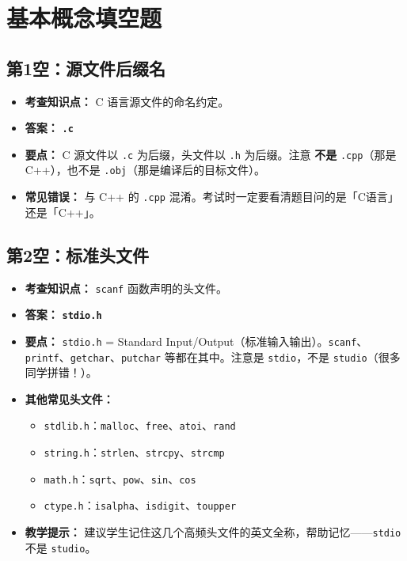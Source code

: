 \section{基本概念填空题}

\subsection{第1空：源文件后缀名}

\begin{itemize}
    \item \textbf{考查知识点：} C 语言源文件的命名约定。
    \item \textbf{答案：} \texttt{\textbf{.c}}
    \item \textbf{要点：} C 源文件以 \texttt{.c} 为后缀，头文件以 \texttt{.h} 为后缀。注意 \textbf{不是} \texttt{.cpp}（那是 C++），也不是 \texttt{.obj}（那是编译后的目标文件）。
    \item \textbf{常见错误：} 与 C++ 的 \texttt{.cpp} 混淆。考试时一定要看清题目问的是「C语言」还是「C++」。
\end{itemize}

\subsection{第2空：标准头文件}

\begin{itemize}
    \item \textbf{考查知识点：} \texttt{scanf} 函数声明的头文件。
    \item \textbf{答案：} \texttt{\textbf{stdio.h}}
    \item \textbf{要点：} \texttt{stdio.h} = Standard Input/Output（标准输入输出）。\texttt{scanf}、\texttt{printf}、\texttt{getchar}、\texttt{putchar} 等都在其中。注意是 \texttt{stdio}，不是 \texttt{studio}（很多同学拼错！）。
    \item \textbf{其他常见头文件：}
    \begin{itemize}
        \item \texttt{stdlib.h}：\texttt{malloc}、\texttt{free}、\texttt{atoi}、\texttt{rand}
        \item \texttt{string.h}：\texttt{strlen}、\texttt{strcpy}、\texttt{strcmp}
        \item \texttt{math.h}：\texttt{sqrt}、\texttt{pow}、\texttt{sin}、\texttt{cos}
        \item \texttt{ctype.h}：\texttt{isalpha}、\texttt{isdigit}、\texttt{toupper}
    \end{itemize}
    \item \textbf{教学提示：} 建议学生记住这几个高频头文件的英文全称，帮助记忆——\texttt{stdio} 不是 \texttt{studio}。
\end{itemize}

